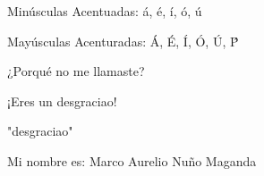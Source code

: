 \documentclass{book}
\begin{document}
Minúsculas Acentuadas: á, é, í, ó, ú

Mayúsculas Acenturadas: Á, É, Í, Ó, Ú, Ṕ 

¿Porqué no me llamaste? 

¡Eres un desgraciao!

"desgraciao"

Mi nombre es: Marco Aurelio Nuño Maganda \\ 
\end{document}
